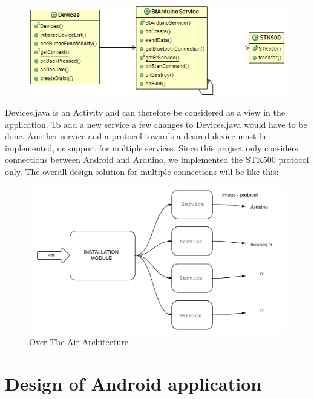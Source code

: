 	\begin{figure}[H]
	\centering
	\includegraphics[width=130mm]{images/BTConnection.png}
	\end{figure}

	Devices.java is an Activity and can therefore be considered as a view in the application. To add a new service a few changes to Devices.java would have to be done. Another service and a protocol towards a desired device must be implemented, or support for multiple services. Since this project only considers connections between Android and Arduino, we implemented the STK500 protocol only.
	The overall design solution for multiple connections will be like this:\\

	\begin{figure}[H]
	\includegraphics[scale=0.7]{figures/OTAArchitecture.pdf}
	\caption{Over The Air Architecture}
	\end{figure}

\section{Design of Android application}


